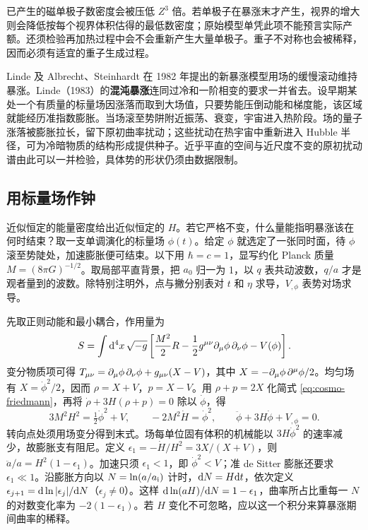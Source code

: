 已产生的磁单极子数密度会被压低 $Z^3$ 倍。若单极子在暴涨末才产生，视界的增大则会降低按每个视界体积估得的最低数密度；原始模型单凭此项不能预言实际产额。还须检验再加热过程中会不会重新产生大量单极子。重子不对称也会被稀释，因而必须有适宜的重子生成过程。

Linde 及 Albrecht、Steinhardt 在 1982 年提出的新暴涨模型用场的缓慢滚动维持暴涨。Linde（1983）的\textbf{混沌暴涨}连同过冷和一阶相变的要求一并省去。设早期某处一个有质量的标量场因涨落而取到大场值，只要势能压倒动能和梯度能，该区域就能经历准指数膨胀。当场滚至势阱附近振荡、衰变，宇宙进入热阶段。场的量子涨落被膨胀拉长，留下原初曲率扰动；这些扰动在热宇宙中重新进入 Hubble 半径，可为冷暗物质的结构形成提供种子。近乎平直的空间与近尺度不变的原初扰动谱由此可以一并检验，具体势的形状仍须由数据限制。

\subsection{用标量场作钟}\label{sec:cosmo-infl-clock}

近似恒定的能量密度给出近似恒定的 $H$。若它严格不变，什么量能指明暴涨该在何时结束？取一支单调演化的标量场 $\phi(t)$。给定 $\phi$ 就选定了一张同时面，待 $\phi$ 滚至势陡处，加速膨胀便可结束。以下用 $\hbar=c=1$，显写约化 Planck 质量 $M=(8\pi G)^{-1/2}$。取局部平直背景，把 $a_0$ 归一为 1，以 $q$ 表共动波数，$q/a$ 才是观者量到的波数。除特别注明外，点与撇分别表对 $t$ 和 $\eta$ 求导，$V_{,\phi}$ 表势对场求导。

先取正则动能和最小耦合，作用量为
\begin{equation}\label{eq:cosmo-inf-action}
 S=\int \dd^4x\,\sqrt{-g}
 \left[\frac{M^2}{2}R-\frac12g^{\mu\nu}\partial_\mu\phi\,\partial_\nu\phi-V(\phi)\right].
\end{equation}
变分物质项可得 $T_{\mu\nu}=\partial_\mu\phi\,\partial_\nu\phi+g_{\mu\nu}(X-V)$，其中 $X=-\partial_\mu\phi\,\partial^\mu\phi/2$。均匀场有 $X=\dot\phi^2/2$，因而 $\rho=X+V$，$p=X-V$。用 $\rho+p=2X$ 化简式 \eqref{eq:cosmo-friedmann}，再将 $\dot\rho+3H(\rho+p)=0$ 除以 $\dot\phi$，得
\begin{equation}\label{eq:cosmo-inf-bg}
 3M^2H^2=\tfrac12\dot\phi^2+V,\qquad
 -2M^2\dot H=\dot\phi^2,\qquad
 \ddot\phi+3H\dot\phi+V_{,\phi}=0 .
\end{equation}
转向点处须用场变分得到末式。场每单位固有体积的机械能以 $3H\dot\phi^2$ 的速率减少，故膨胀支有阻尼。定义 $\epsilon_1=-\dot H/H^2=3X/(X+V)$，则 $\ddot a/a=H^2(1-\epsilon_1)$。加速只须 $\epsilon_1<1$，即 $\dot\phi^2<V$；准 de Sitter 膨胀还要求 $\epsilon_1\ll1$。沿膨胀方向以 $N=\ln(a/a_{\rm i})$ 计时，$\dd N=H\dd t$，依次定义 $\epsilon_{j+1}=\dd\ln|\epsilon_j|/\dd N$（$\epsilon_j\ne0$）。这样 $\dd\ln(aH)/\dd N=1-\epsilon_1$，曲率所占比重每一 $N$ 的对数变化率为 $-2(1-\epsilon_1)$。若 $H$ 变化不可忽略，应以这一个积分来算暴涨期间曲率的稀释。

